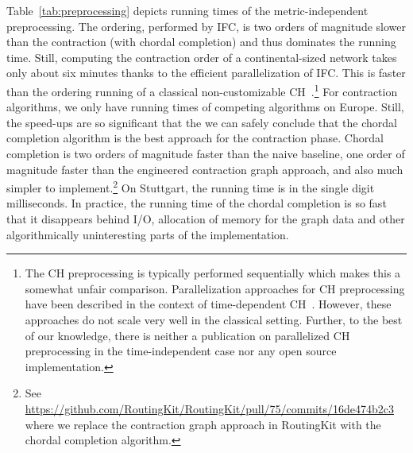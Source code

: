 \documentclass[a4paper, english, cleveref]{lipics-v2021}
\begin{document}
Table~\ref{tab:preprocessing} depicts running times of the metric-independent preprocessing.
The ordering, performed by IFC, is two orders of magnitude slower than the contraction (with chordal completion) and thus dominates the running time.
Still, computing the contraction order of a continental-sized network takes only about six minutes thanks to the efficient parallelization of IFC.
This is faster than the ordering running of a classical non-customizable CH~\cite{GeisbergerSSV12}.\footnote{
The CH preprocessing is typically performed sequentially which makes this a somewhat unfair comparison.
Parallelization approaches for CH preprocessing have been described in the context of time-dependent CH~\cite{TODO}.
However, these approaches do not scale very well in the classical setting.
Further, to the best of our knowledge, there is neither a publication on parallelized CH preprocessing in the time-independent case nor any open source implementation.
}
For contraction algorithms, we only have running times of competing algorithms on Europe.
Still, the speed-ups are so significant that the we can safely conclude that the chordal completion algorithm is the best approach for the contraction phase.
Chordal completion is two orders of magnitude faster than the naive baseline, one order of magnitude faster than the engineered contraction graph approach, and also much simpler to implement.\footnote{See \url{https://github.com/RoutingKit/RoutingKit/pull/75/commits/16de474b2c3} where we replace the contraction graph approach in RoutingKit with the chordal completion algorithm.}
On Stuttgart, the running time is in the single digit milliseconds.
In practice, the running time of the chordal completion is so fast that it disappears behind I/O, allocation of memory for the graph data and other algorithmically uninteresting parts of the implementation.

\begin{table}
\centering
\setlength{\tabcolsep}{5pt}
\caption{
Running times by number of threads of different steps of the customization phase on Stuttgart and Europe in comparison with the baseline results reported in~\cite{DibbeltSW16} and the improvements proposed in~\cite{BuchholdSW19}.
Our results and the numbers from~\cite{DibbeltSW16,BuchholdSW19} were obtained on the same machine.
}\label{tab:customization}

\end{table}
\end{document}
